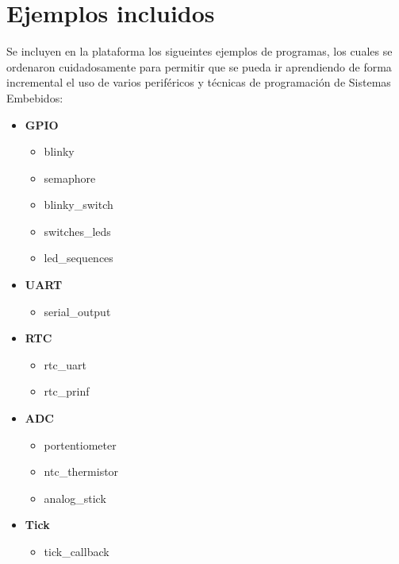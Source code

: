 \newpage
\section{Ejemplos incluidos}

Se incluyen en la plataforma los sigueintes ejemplos de programas, los cuales se ordenaron cuidadosamente para permitir que se pueda ir aprendiendo de forma incremental el uso de varios periféricos y técnicas de programación de Sistemas Embebidos:

\begin{itemize}

\item \textbf{GPIO}
    \begin{itemize}
    \item blinky
    \item semaphore
    \item blinky\_switch
    \item switches\_leds
    \item led\_sequences
    \end{itemize}

\item \textbf{UART}
    \begin{itemize}
    \item serial\_output
    \end{itemize}

\item \textbf{RTC}
    \begin{itemize}
    \item rtc\_uart
    \item rtc\_prinf
    \end{itemize}

\item \textbf{ADC}
    \begin{itemize}
    \item portentiometer
    \item ntc\_thermistor
    \item analog\_stick
    \end{itemize}
\item \textbf{Tick}
    \begin{itemize}
    \item tick\_callback
    \end{itemize}


\end{itemize}
